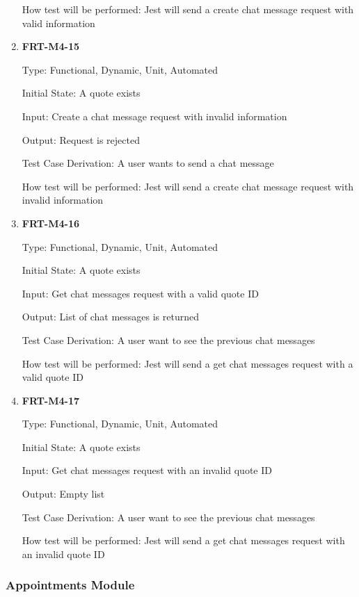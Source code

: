 \documentclass[12pt, titlepage]{article}
\begin{document}
\begin{enumerate}
	      How test will be performed: Jest will send a create chat message request with valid information

	\item \textbf{FRT-M4-15}

	      Type: Functional, Dynamic, Unit, Automated

	      Initial State: A quote exists

	      Input: Create a chat message request with invalid information

	      Output: Request is rejected

	      Test Case Derivation: A user wants to send a chat message

	      How test will be performed: Jest will send a create chat message request with invalid information

	\item \textbf{FRT-M4-16}

	      Type: Functional, Dynamic, Unit, Automated

	      Initial State: A quote exists

	      Input: Get chat messages request with a valid quote ID

	      Output: List of chat messages is returned

	      Test Case Derivation: A user want to see the previous chat messages

	      How test will be performed: Jest will send a get chat messages request with a valid quote ID

	\item \textbf{FRT-M4-17}

	      Type: Functional, Dynamic, Unit, Automated

	      Initial State: A quote exists

	      Input: Get chat messages request with an invalid quote ID

	      Output: Empty list

	      Test Case Derivation: A user want to see the previous chat messages

	      How test will be performed: Jest will send a get chat messages request with an invalid quote ID

\end{enumerate}

\subsubsection{Appointments Module}
\end{document}
